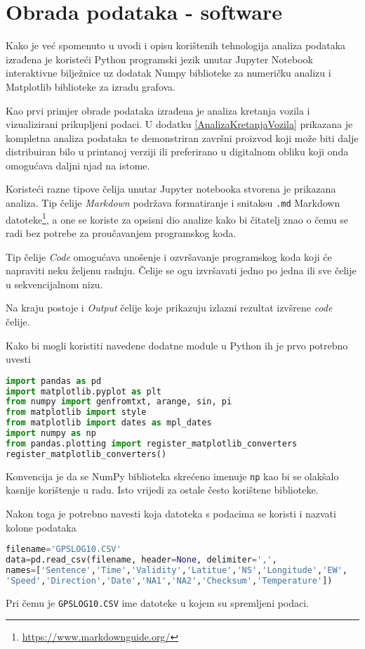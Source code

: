 \chapter{Obrada podataka - software}
Kako je već spomenuto u uvodi i opisu korištenih tehnologija analiza podataka izrađena je koristeći Python programski jezik unutar Jupyter Notebook interaktivne bilježnice uz dodatak Numpy biblioteke za numeričku analizu i Matplotlib biblioteke za izradu grafova.

Kao prvi primjer obrade podataka izrađena je analiza kretanja vozila i vizualizirani prikupljeni podaci.
U dodatku \ref{AnalizaKretanjaVozila} prikazana je kompletna analiza podataka te demonstriran završni proizvod koji može biti dalje distribuiran bilo u printanoj verziji ili preferirano u digitalnom obliku koji onda omogućava daljni njad na istome.

Koristeći razne tipove čelija unutar Jupyter notebooka stvorena je prikazana analiza.
Tip čelije \textit{Markdown} podržava formatiranje i snitaksu \texttt{.md} Markdown datoteke\footnote{\url{https://www.markdownguide.org/}}, a one se koriste za opsisni dio analize kako bi čitatelj znao o čemu se radi bez potrebe za proučavanjem programskog koda.

Tip čelije \textit{Code} omogućava unošenje i ozvršavanje programskog koda koji će napraviti neku željenu radnju.
Čelije se ogu izvršavati jedno po jedna ili sve čelije u sekvencijalnom nizu.

Na kraju postoje i \textit{Output} čelije koje prikazuju izlazni rezultat izvšrene \textit{code} čelije.

Kako bi mogli koristiti navedene dodatne module u Python ih je prvo potrebno uvesti
\begin{lstlisting}[language=Python]
import pandas as pd
import matplotlib.pyplot as plt
from numpy import genfromtxt, arange, sin, pi
from matplotlib import style
from matplotlib import dates as mpl_dates
import numpy as np
from pandas.plotting import register_matplotlib_converters
register_matplotlib_converters()
\end{lstlisting}

Konvencija je da se NumPy biblioteka skrećeno imenuje \texttt{np} kao bi se olakšalo kasnije korištenje u radu.
Isto vrijedi za ostale često korištene biblioteke.

Nakon toga je potrebno navesti koja datoteka s podacima se koristi i nazvati kolone podataka 
\begin{lstlisting}[language=Python]
filename='GPSLOG10.CSV'
data=pd.read_csv(filename, header=None, delimiter=',',
names=['Sentence','Time','Validity','Latitue','NS','Longitude','EW',
'Speed','Direction','Date','NA1','NA2','Checksum','Temperature'])
\end{lstlisting}
Pri čemu je \texttt{GPSLOG10.CSV} ime datoteke u kojem su spremljeni podaci.

